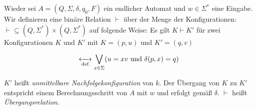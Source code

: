 \documentclass[runningheads,deutsch]{llncs}
\begin{document}
\begin{definition}
    Wieder sei $A = (Q, \Sigma, \delta, q_0, F)$ ein endlicher Automat und $w\in \Sigma^*$ eine Eingabe. Wir definieren eine binäre Relation $\vdash$ über der Menge der Konfigurationen: $\vdash \subseteq (Q, \Sigma^*) \times (Q, \Sigma^*)$ auf folgende Weise:
    Es gilt $K \vdash K'$ für zwei Konfigurationen $K$ und $K'$ mit $K=(p,u)$ und $K'=(q,v)$

    \[ \xleftrightarrow[\text{def.}]{} \bigvee_{x \in \Sigma} (u = xv \text{ und } \delta(p,x)=q)\]
    
    $K'$ heißt \textit{unmittelbare Nachfolgekonfiguration} von $k$. Der Übergang von $K$ zu $K'$ entspricht einem Berechnungsschritt von $A$ mit $w$ und erfolgt gemäß $\delta$. $\vdash$ heißt \textit{Übergangsrelation}.
\end{definition}
\end{document}
